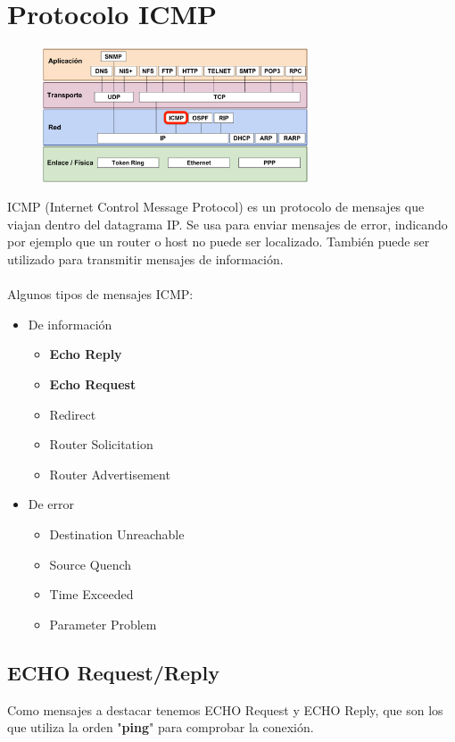 \section{Protocolo ICMP}
\begin{figure}[H]
    \centering
    \includegraphics[width=0.7\textwidth]{img/ICMP.png}
\end{figure}
ICMP (Internet Control Message Protocol) es un protocolo de mensajes que viajan dentro del datagrama IP. Se usa para enviar mensajes de error, indicando por ejemplo que un router o host no puede ser localizado. También puede ser utilizado para transmitir mensajes de información.
\\\\
Algunos tipos de mensajes ICMP:
\begin{itemize}
\item De información
	\begin{itemize}
	\item \textbf{Echo Reply}
	\item \textbf{Echo Request}
    \item Redirect
    \item Router Solicitation
    \item Router Advertisement
	\end{itemize}
\item De error
	\begin{itemize}
	\item Destination Unreachable
    \item Source Quench
    \item Time Exceeded
    \item Parameter Problem
	\end{itemize}
\end{itemize}
\subsection{ECHO Request/Reply}
Como mensajes a destacar tenemos ECHO Request y ECHO Reply, que son los que utiliza la orden "\textbf{ping}" para comprobar la conexión.\\

